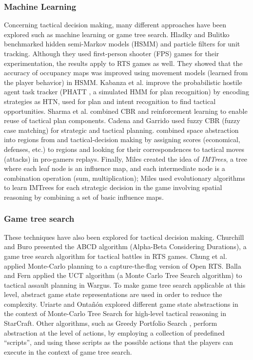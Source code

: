 \documentclass{llncs}
\begin{document}
\subsubsection{Machine Learning}
Concerning tactical  decision making,  many different  approaches have
been explored  such as machine  learning or game tree  search.  Hladky
and  Bulitko \cite{Hladky2008}  benchmarked hidden  semi-Markov models
(HSMM)  and particle  filters for  unit tracking.  Although they  used
first-person  shooter  (FPS)  games  for  their  experimentation,  the
results apply to  RTS games as well. They showed  that the accuracy of
occupancy maps  was improved using  movement models (learned  from the
player behavior)  in HSMM. Kabanza  et al. \cite{OBRecog}  improve the
probabilistic  hostile  agent  task  tracker  (PHATT  \cite{PHATT},  a
simulated HMM  for plan  recognition) by  encoding strategies  as HTN,
used   for   plan   and    intent   recognition   to   find   tactical
opportunities.   Sharma  et   al.  \cite{CBR-RL}   combined  CBR   and
reinforcement   learning   to   enable    reuse   of   tactical   plan
components. Cadena and Garrido  \cite{CadenaG11} used fuzzy CBR (fuzzy
case       matching)       for      strategic       and       tactical
planning.  \cite{SynnaeveTactics}  combined   space  abstraction  into
regions   from  \cite{Perkins10}   and  tactical-decision   making  by
assigning scores  (economical, defenses, etc.) to  regions and looking
for their  correspondences to  tactical moves (attacks)  in pro-gamers
replays.  Finally,  Miles \cite{miles2006co} created the  idea of {\em
  IMTrees}, a tree where each leaf  node is an influence map, and each
intermediate node  is a  combination operation  (sum, multiplication);
Miles used evolutionary algorithms to learn IMTrees for each strategic
decision in the game involving spatial reasoning by combining a set of
basic influence maps.

\subsubsection{Game  tree search}
These  techniques  have  also  been  explored  for  tactical  decision
making. Churchill and Buro \cite{churchill2012fast} presented the ABCD
algorithm  (Alpha-Beta  Considering  Durations), a  game  tree  search
algorithm   for   tactical   battles   in   RTS   games.    Chung   et
al. \cite{Chung05} applied Monte-Carlo  planning to a capture-the-flag
version  of Open  RTS.   Balla  and Fern  \cite{UCT}  applied the  UCT
algorithm (a  Monte Carlo Tree  Search algorithm) to  tactical assault
planning in Wargus. To make game tree search applicable at this level,
abstract game  state representations are  used in order to  reduce the
complexity. Uriarte and Onta\~{n}\'{o}n \cite{uriarte2014high,uriarte2014game} explored different game state abstractions in the context of Monte-Carlo Tree Search for high-level tactical reasoning in StarCraft. Other algorithms, such as Greedy Portfolio Search \cite{churchill2013portfolio}, perform abstraction at the level of actions, by employing a collection of predefined ``scripts'', and using these scripts as the possible actions that the players can execute in the context of game tree search.
\end{document}
